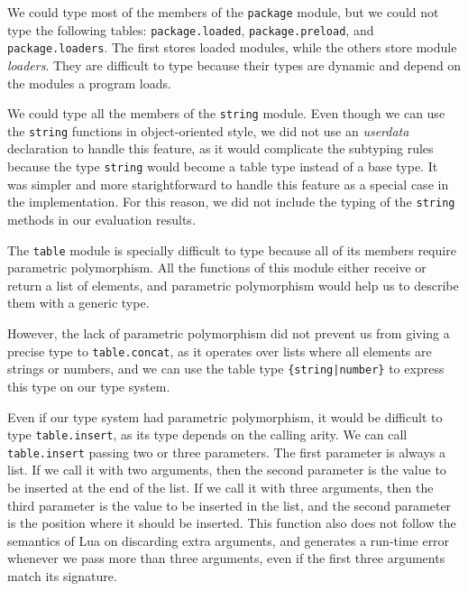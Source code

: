 We could type most of the members of the \texttt{package} module,
but we could not type the following tables: \texttt{package.loaded},
\texttt{package.preload}, and \texttt{package.loaders}.
The first stores loaded modules, while the others store module \emph{loaders}.
They are difficult to type because their types are dynamic and
depend on the modules a program loads.

We could type all the members of the \texttt{string} module.
Even though we can use the \texttt{string} functions in object-oriented style,
we did not use an \emph{userdata} declaration to handle this feature,
as it would complicate the subtyping rules because the type \texttt{string}
would become a table type instead of a base type.
It was simpler and more starightforward to handle this feature as a
special case in the implementation.
For this reason, we did not include the typing of the \texttt{string} methods
in our evaluation results.

The \texttt{table} module is specially difficult to type because
all of its members require parametric polymorphism.
All the functions of this module either receive or return a list
of elements, and parametric polymorphism would help us to describe
them with a generic type.

However, the lack of parametric polymorphism did not prevent us from
giving a precise type to \texttt{table.concat}, as it operates over lists
where all elements are strings or numbers, and we can use the table type
\texttt{\{string|number\}} to express this type on our type system.

Even if our type system had parametric polymorphism, it would
be difficult to type \texttt{table.insert}, as its type depends on
the calling arity.
We can call \texttt{table.insert} passing two or three parameters.
The first parameter is always a list.
If we call it with two arguments, then the second parameter
is the value to be inserted at the end of the list.
If we call it with three arguments, then the third parameter
is the value to be inserted in the list, and the second
parameter is the position where it should be inserted.
This function also does not follow the semantics of Lua on
discarding extra arguments, and generates a run-time error whenever
we pass more than three arguments, even if the first three arguments
match its signature.

